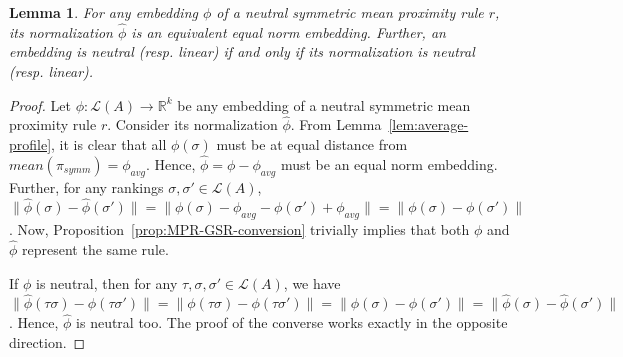 \documentclass[10pt,letterpaper]{article}
\newcommand{\calL}{{\mathcal{L}}}
\newcommand{\rank}{{\calL(A)}}
\DeclareMathOperator*{\argmin}{arg\,min}
\newtheorem{lemma}{Lemma}
\begin{document}

\begin{lemma}
For any embedding $\phi$ of a neutral symmetric mean proximity rule $r$, its normalization $\hat{\phi}$ is an equivalent equal norm embedding. Further, an embedding is neutral (resp. linear) if and only if its normalization is neutral (resp. linear). 
\label{lem:preservation}
\end{lemma}
\begin{proof}
Let $\phi : \rank \rightarrow \mathbb{R}^k$ be any embedding of a neutral symmetric mean proximity rule $r$. Consider its normalization $\hat{\phi}$. From Lemma~\ref{lem:average-profile}, it is clear that all $\phi(\sigma)$ must be at equal distance from $mean(\pi_{symm}) = \phi_{avg}$. Hence, $\hat{\phi} = \phi-\phi_{avg}$ must be an equal norm embedding. Further, for any rankings $\sigma, \sigma' \in \rank$, $\|\hat{\phi}(\sigma)-\hat{\phi}(\sigma')\| = \|\phi(\sigma)-\phi_{avg}-\phi(\sigma')+\phi_{avg}\| = \|\phi(\sigma)-\phi(\sigma')\|$. Now, Proposition~\ref{prop:MPR-GSR-conversion} trivially implies that both $\phi$ and $\hat{\phi}$ represent the same rule. 

If $\phi$ is neutral, then for any $\tau,\sigma,\sigma' \in \rank$, we have $\|\hat{\phi}(\tau \sigma)-\hat{\phi}(\tau \sigma')\| = \|\phi(\tau \sigma)-\phi(\tau \sigma')\| = \|\phi(\sigma)-\phi(\sigma')\| = \|\hat{\phi}(\sigma)-\hat{\phi}(\sigma')\|$. Hence, $\hat{\phi}$ is neutral too. The proof of the converse works exactly in the opposite direction.


\end{proof}
\end{document}
